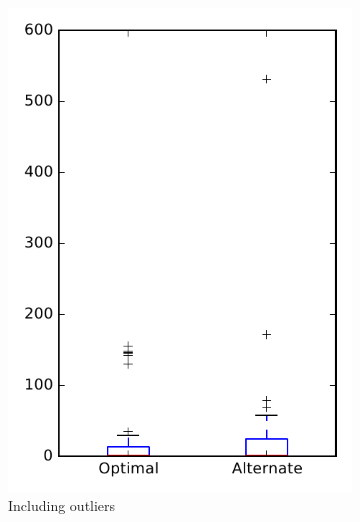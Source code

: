 
\begin{figure}
    \centering
    \begin{subfigure}{.4\textwidth}
        \centering
        \includegraphics[height=0.4\textheight]{figures/combo/flt_rq2_tika}
        \caption{Including outliers}\label{fig:combo:flt:rq2:tika_outlier}
    \end{subfigure}%
    \begin{subfigure}{.4\textwidth}
        \centering

\end{subfigure}
\end{figure}
